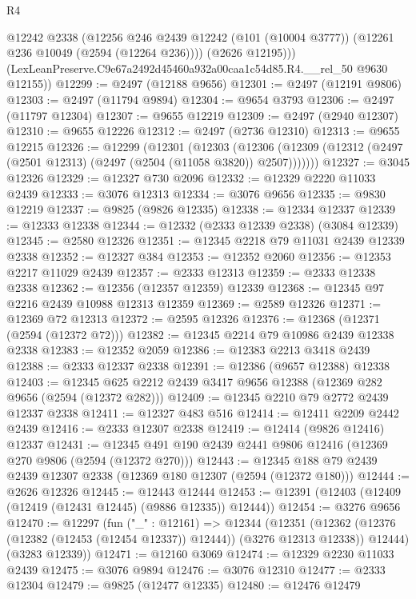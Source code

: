 \begin{lexlean}{R4}
\begin{coremodule}
          @12242
          @2338
          (@12256
            @246
            @2439
            @12242
            (@101 (@10004 @3777))
            (@12261 @236 @10049 (@2594 (@12264 @236))))
          (@2626 @12195)))
      (LexLeanPreserve.C9e67a2492d45460a932a00caa1c54d85.R4.__rel_50 @9630 @12155))
@12299 := @2497 (@12188 @9656)
@12301 := @2497 (@12191 @9806)
@12303 := @2497 (@11794 @9894)
@12304 := @9654 @3793
@12306 := @2497 (@11797 @12304)
@12307 := @9655 @12219
@12309 := @2497 (@2940 @12307)
@12310 := @9655 @12226
@12312 := @2497 (@2736 @12310)
@12313 := @9655 @12215
@12326 := @12299
    (@12301
      (@12303
        (@12306 (@12309 (@12312 (@2497 (@2501 @12313) (@2497 (@2504 (@11058 @3820)) @2507)))))))
@12327 := @3045 @12326
@12329 := @12327 @730 @2096
@12332 := @12329 @2220 @11033 @2439
@12333 := @3076 @12313
@12334 := @3076 @9656
@12335 := @9830 @12219
@12337 := @9825 (@9826 @12335)
@12338 := @12334 @12337
@12339 := @12333 @12338
@12344 := @12332 (@2333 @12339 @2338) (@3084 @12339)
@12345 := @2580 @12326
@12351 := @12345 @2218 @79 @11031 @2439 @12339 @2338
@12352 := @12327 @384
@12353 := @12352 @2060
@12356 := @12353 @2217 @11029 @2439
@12357 := @2333 @12313
@12359 := @2333 @12338 @2338
@12362 := @12356 (@12357 @12359) @12339
@12368 := @12345 @97 @2216 @2439 @10988 @12313 @12359
@12369 := @2589 @12326
@12371 := @12369 @72 @12313
@12372 := @2595 @12326
@12376 := @12368 (@12371 (@2594 (@12372 @72)))
@12382 := @12345 @2214 @79 @10986 @2439 @12338 @2338
@12383 := @12352 @2059
@12386 := @12383 @2213 @3418 @2439
@12388 := @2333 @12337 @2338
@12391 := @12386 (@9657 @12388) @12338
@12403 := @12345 @625 @2212 @2439 @3417 @9656 @12388 (@12369 @282 @9656 (@2594 (@12372 @282)))
@12409 := @12345 @2210 @79 @2772 @2439 @12337 @2338
@12411 := @12327 @483 @516
@12414 := @12411 @2209 @2442 @2439
@12416 := @2333 @12307 @2338
@12419 := @12414 (@9826 @12416) @12337
@12431 := @12345 @491 @190 @2439 @2441 @9806 @12416 (@12369 @270 @9806 (@2594 (@12372 @270)))
@12443 := @12345 @188 @79 @2439 @2439 @12307 @2338 (@12369 @180 @12307 (@2594 (@12372 @180)))
@12444 := @2626 @12326
@12445 := @12443 @12444
@12453 := @12391 (@12403 (@12409 (@12419 (@12431 @12445) (@9886 @12335)) @12444))
@12454 := @3276 @9656
@12470 := @12297
    (fun ("_" : @12161) =>
    @12344
      (@12351
        (@12362 (@12376 (@12382 (@12453 (@12454 @12337)) @12444)) (@3276 @12313 @12338))
        @12444)
      (@3283 @12339))
@12471 := @12160 @3069
@12474 := @12329 @2230 @11033 @2439
@12475 := @3076 @9894
@12476 := @3076 @12310
@12477 := @2333 @12304
@12479 := @9825 (@12477 @12335)
@12480 := @12476 @12479

\end{coremodule}
\end{lexlean}
